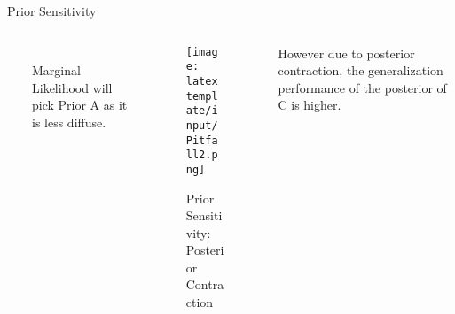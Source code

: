 \documentclass[t, aspectratio=169]{beamer}
\begin{document}

\begin{frame}{Prior Sensitivity}
 \begin{columns}[onlytextwidth]\

\begin{column}{0.2\textwidth}\\
\vspace{7cm}
Marginal Likelihood will pick Prior A as it is less diffuse. 

\end{column}



   \begin{column}{.5\textwidth}
   \begin{figure}
       \centering
       \texttt{[image: latex template/input/Pitfall2.png]}
       \caption{Prior Sensitivity: Posterior Contraction \cite{Lofti}}
      
   \end{figure}
   \end{column}
   
   \begin{column}{0.2\textwidth}
However due to posterior contraction, the generalization performance of the posterior of C is higher.

\end{column}
 \end{columns}
 \end{frame} 
 


\end{document}

